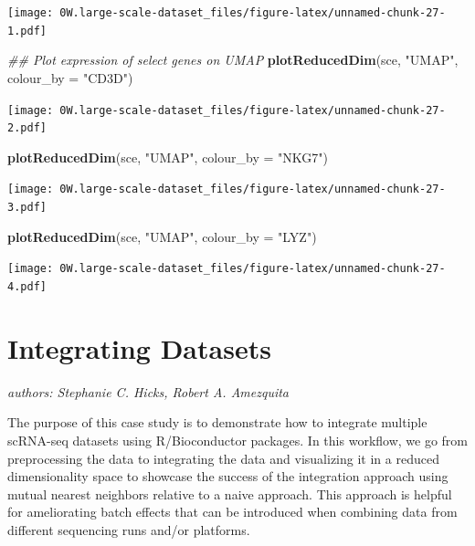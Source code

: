 \documentclass[]{book}
\newenvironment{Shaded}{\begin{snugshade}}{\end{snugshade}}
\newcommand{\CommentTok}[1]{\textcolor[rgb]{0.56,0.35,0.01}{\textit{#1}}}
\newcommand{\DataTypeTok}[1]{\textcolor[rgb]{0.13,0.29,0.53}{#1}}
\newcommand{\KeywordTok}[1]{\textcolor[rgb]{0.13,0.29,0.53}{\textbf{#1}}}
\newcommand{\NormalTok}[1]{#1}
\newcommand{\StringTok}[1]{\textcolor[rgb]{0.31,0.60,0.02}{#1}}
\begin{document}
\texttt{[image: 0W.large-scale-dataset\_files/figure-latex/unnamed-chunk-27-1.pdf]}

\begin{Shaded}
\begin{Highlighting}[]
\CommentTok{## Plot expression of select genes on UMAP}
\KeywordTok{plotReducedDim}\NormalTok{(sce, }\StringTok{"UMAP"}\NormalTok{, }\DataTypeTok{colour_by =} \StringTok{"CD3D"}\NormalTok{)}
\end{Highlighting}
\end{Shaded}

\texttt{[image: 0W.large-scale-dataset\_files/figure-latex/unnamed-chunk-27-2.pdf]}

\begin{Shaded}
\begin{Highlighting}[]
\KeywordTok{plotReducedDim}\NormalTok{(sce, }\StringTok{"UMAP"}\NormalTok{, }\DataTypeTok{colour_by =} \StringTok{"NKG7"}\NormalTok{)}
\end{Highlighting}
\end{Shaded}

\texttt{[image: 0W.large-scale-dataset\_files/figure-latex/unnamed-chunk-27-3.pdf]}

\begin{Shaded}
\begin{Highlighting}[]
\KeywordTok{plotReducedDim}\NormalTok{(sce, }\StringTok{"UMAP"}\NormalTok{, }\DataTypeTok{colour_by =} \StringTok{"LYZ"}\NormalTok{)}
\end{Highlighting}
\end{Shaded}

\texttt{[image: 0W.large-scale-dataset\_files/figure-latex/unnamed-chunk-27-4.pdf]}

\hypertarget{integrating-datasets}{%
\chapter{Integrating Datasets}\label{integrating-datasets}}

\emph{authors: Stephanie C. Hicks, Robert A. Amezquita}

The purpose of this case study is to demonstrate how to integrate multiple scRNA-seq datasets using R/Bioconductor packages. In this workflow, we go from preprocessing the data to integrating the data and visualizing it in a reduced dimensionality space to showcase the success of the integration approach using mutual nearest neighbors relative to a naive approach. This approach is helpful for ameliorating batch effects that can be introduced when combining data from different sequencing runs and/or platforms.
\end{document}
